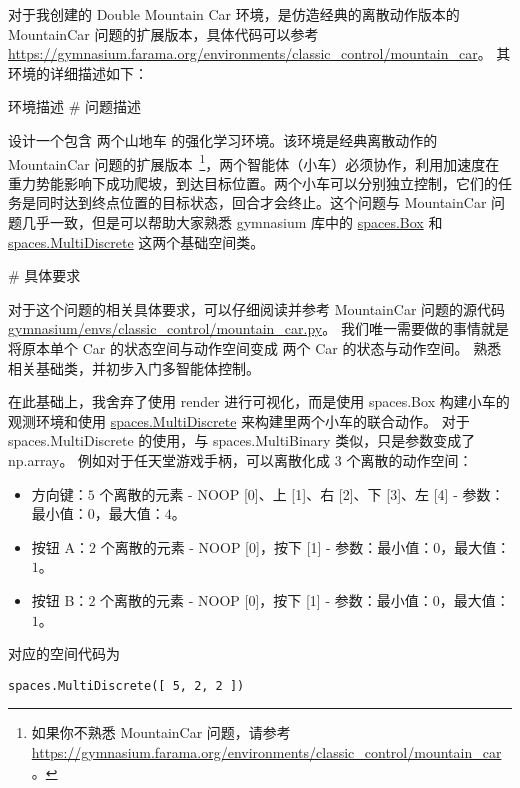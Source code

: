 对于我创建的 Double Mountain Car 环境，是仿造经典的离散动作版本的 MountainCar 问题的扩展版本，具体代码可以参考 \href{https://gymnasium.farama.org/environments/classic_control/mountain_car}{https://gymnasium.farama.org/environments/classic\_control/mountain\_car}。
其环境的详细描述如下：

\begin{definition*}{环境描述}
\# 问题描述

    设计一个包含 两个山地车 的强化学习环境。该环境是经典离散动作的 MountainCar 问题的扩展版本~\footnote{如果你不熟悉 MountainCar 问题，请参考 \href{https://gymnasium.farama.org/environments/classic_control/mountain_car}{https://gymnasium.farama.org/environments/classic\_control/mountain\_car}。}，两个智能体（小车）必须协作，利用加速度在重力势能影响下成功爬坡，到达目标位置。两个小车可以分别独立控制，它们的任务是同时达到终点位置的目标状态，回合才会终止。这个问题与 MountainCar 问题几乎一致，但是可以帮助大家熟悉 gymnasium 库中的 \href{https://gymnasium.farama.org/api/spaces/fundamental/#gymnasium.spaces.Box}{spaces.Box} 和 \href{https://gymnasium.farama.org/api/spaces/fundamental/#gymnasium.spaces.MultiDiscrete}{spaces.MultiDiscrete} 这两个基础空间类。

\# 具体要求

对于这个问题的相关具体要求，可以仔细阅读并参考 MountainCar 问题的源代码 \href{https://github.com/Farama-Foundation/Gymnasium/blob/main/gymnasium/envs/classic_control/mountain_car.py}{gymnasium/envs/classic\_control/mountain\_car.py}。
我们唯一需要做的事情就是将原本单个 Car 的状态空间与动作空间变成 两个 Car 的状态与动作空间。
熟悉相关基础类，并初步入门多智能体控制。
\end{definition*}

在此基础上，我舍弃了使用 \textsf{render} 进行可视化，而是使用 \textsf{spaces.Box} 构建小车的观测环境和使用 \href{https://gymnasium.farama.org/api/spaces/fundamental/#gymnasium.spaces.MultiDiscrete}{\textsf{spaces.MultiDiscrete}} 来构建里两个小车的联合动作。
对于 \textsf{spaces.MultiDiscrete} 的使用，与 \textsf{spaces.MultiBinary} 类似，只是参数变成了 \textsf{np.array}。
例如对于任天堂游戏手柄，可以离散化成 \(3\) 个离散的动作空间：
\begin{itemize}
    \item 方向键：\(5\) 个离散的元素 - NOOP [0]、上 [1]、右 [2]、下 [3]、左 [4] - 参数：最小值：\(0\)，最大值：\(4\)。
    \item 按钮 A：\(2\) 个离散的元素 - NOOP [0]，按下 [1] - 参数：最小值：\(0\)，最大值：\(1\)。
    \item 按钮 B：\(2\) 个离散的元素 - NOOP [0]，按下 [1] - 参数：最小值：\(0\)，最大值：\(1\)。
\end{itemize}
对应的空间代码为
\begin{verbatim}
spaces.MultiDiscrete([ 5, 2, 2 ])
\end{verbatim}


